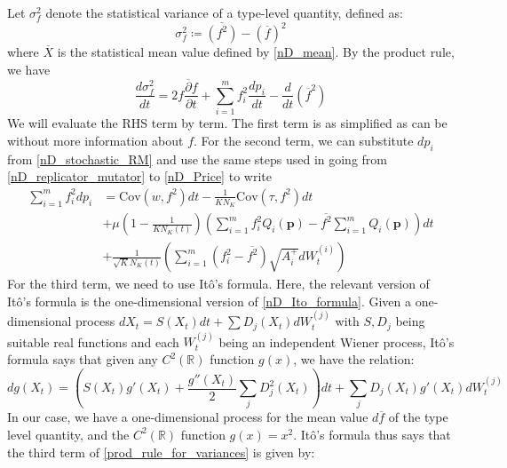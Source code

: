 Let $\sigma^2_{f}$ denote the statistical variance of a type-level quantity, defined as:
\begin{equation}
    \sigma^2_{f} \coloneqq \overline{(f^2)} - (\overline{f})^2
\end{equation}
where $\overline{X}$ is the statistical mean value defined by \eqref{nD_mean}. By the product rule, we have
\begin{equation}
\label{prod_rule_for_variances}
\frac{d\sigma^2_{f}}{dt} = 2\overline{f\frac{\partial f}{\partial t}} + \sum\limits_{i=1}^{m}f_i^2\frac{dp_i}{dt} - \frac{d}{dt}(\overline{f}^2)
\end{equation}
We will evaluate the RHS term by term. The first term is as simplified as can be without more information about $f$. For the second term, we can substitute $dp_i$ from \eqref{nD_stochastic_RM} and use the same steps used in going from \eqref{nD_replicator_mutator} to \eqref{nD_Price} to write
\begin{equation}
\label{2nd_term_for_variances}
\begin{aligned}
\sum\limits_{i=1}^{m}f_i^2dp_i &= \textrm{Cov}(w,f^2)dt - \frac{1}{KN_K}\textrm{Cov}(\tau,f^2)dt\\
&+ \mu\left(1-\frac{1}{KN_K(t)}\right)\left(\sum\limits_{i=1}^{m}f^2_iQ_i(\mathbf{p}) - \overline{f^2}\sum\limits_{i=1}^{m}Q_i(\mathbf{p})\right)dt \\
&+\frac{1}{\sqrt{K}N_{K}(t)}\left(\sum\limits_{i=1}^{m}\left(f^2_i - \overline{f^2}\right)\sqrt{A_i^+}dW_{t}^{(i)}\right)
\end{aligned}
\end{equation}
For the third term, we need to use It\^{o}'s formula. Here, the relevant version of It\^{o}'s formula is the one-dimensional version of \eqref{nD_Ito_formula}. Given a one-dimensional process $dX_t = S(X_t)dt + \sum D_j(X_t)dW^{(j)}_t$ with $S, D_j$ being suitable real functions and each $W^{(j)}_t$ being an independent Wiener process, It\^{o}'s formula says that given any $C^2(\mathbb{R})$ function $g(x)$, we have the relation:
\begin{equation}
\label{1D_Ito_formula}
dg(X_t) = \left(S(X_t)g'(X_t) + \frac{g''(X_t)}{2}\sum\limits_{j}D_j^2(X_t)\right)dt + \sum\limits_{j}D_j(X_t)g'(X_t)dW^{(j)}_t 
\end{equation}
In our case, we have a one-dimensional process for the mean value $d\overline{f}$ of the type level quantity, and the $C^2(\mathbb{R})$ function $g(x) = x^2$. It\^{o}'s formula thus says that the third term of \eqref{prod_rule_for_variances} is given by:
